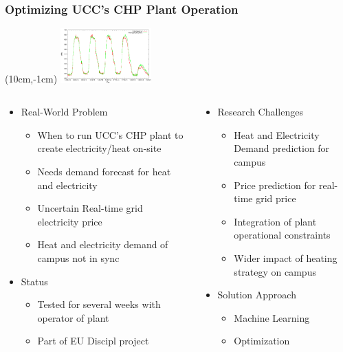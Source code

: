 \begin{frame}
\frametitle{Optimizing UCC's CHP Plant Operation}
\begin{textblock*}{3.5cm}(10cm,-1cm)
\includegraphics[width=3.5cm]{images/campusdemand}
\end{textblock*}
\vspace{0.5cm}
\begin{columns}[b]
\begin{column}{0.5\textwidth}
\begin{itemize}
\item Real-World Problem
\begin{itemize}
\item When to run UCC's CHP plant to create electricity/heat on-site
\item Needs demand forecast for heat and electricity
\item Uncertain Real-time grid electricity price
\item Heat and electricity demand of campus not in sync
\end{itemize}
\item Status
\begin{itemize}
\item Tested for several weeks with operator of plant
\item Part of EU Discipl project
\end{itemize}
\end{itemize}
\end{column}
\begin{column}{0.5\textwidth}
\begin{itemize}
\item Research Challenges
\begin{itemize}
\item Heat and Electricity Demand prediction for campus
\item Price prediction for real-time grid price
\item Integration of plant operational constraints
\item Wider impact of heating strategy on campus 
\end{itemize}
\item Solution Approach
\begin{itemize}
\item Machine Learning
\item Optimization
\end{itemize}
\end{itemize}
\end{column}
\end{columns}
\end{frame}

